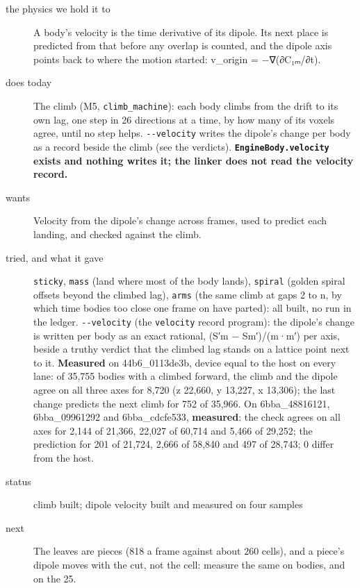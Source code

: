 \begin{description}
\item[{the physics we hold it to}] A body's velocity is the time derivative of its dipole. Its next place is predicted from that before any overlap is counted, and the dipole axis points back to where the motion started: v\_\allowbreak{}origin = −∇(∂C₁ₘ/∂t).
\item[{does today}] The climb (M5, \texttt{climb\_\allowbreak{}machine}): each body climbs from the drift to its own lag, one step in 26 directions at a time, by how many of its voxels agree, until no step helps. \texttt{-\allowbreak{}-\allowbreak{}velocity} writes the dipole's change per body as a record beside the climb (see the verdicts). \textbf{\texttt{Engine\allowbreak{}Body.\allowbreak{}velocity} exists and nothing writes it; the linker does not read the velocity record.}
\item[{wants}] Velocity from the dipole's change across frames, used to predict each landing, and checked against the climb.
\item[{tried, and what it gave}] \texttt{sticky}, \texttt{mass} (land where most of the body lands), \texttt{spiral} (golden spiral offsets beyond the climbed lag), \texttt{arms} (the same climb at gaps 2 to n, by which time bodies too close one frame on have parted): all built, no run in the ledger. \texttt{-\allowbreak{}-\allowbreak{}velocity} (the \texttt{velocity} record program): the dipole's change is written per body as an exact rational, (S′m − Sm′)/(m·m′) per axis, beside a truthy verdict that the climbed lag stands on a lattice point next to it. \textbf{Measured} on 44b6\_\allowbreak{}0113de3b, device equal to the host on every lane: of 35,755 bodies with a climbed forward, the climb and the dipole agree on all three axes for 8,720 (z 22,660, y 13,227, x 13,306); the last change predicts the next climb for 752 of 35,966. On 6bba\_\allowbreak{}48816121, 6bba\_\allowbreak{}09961292 and 6bba\_\allowbreak{}cdcfe533, \textbf{measured}: the check agrees on all axes for 2,144 of 21,366, 22,027 of 60,714 and 5,466 of 29,252; the prediction for 201 of 21,724, 2,666 of 58,840 and 497 of 28,743; 0 differ from the host.
\item[{status}] climb built; dipole velocity built and measured on four samples
\item[{next}] The leaves are pieces (818 a frame against about 260 cells), and a piece's dipole moves with the cut, not the cell: measure the same on bodies, and on the 25.
\end{description}

